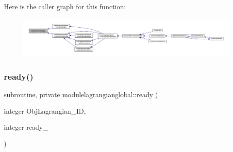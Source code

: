 Here is the caller graph for this function\+:\nopagebreak
\begin{figure}[H]
\begin{center}
\leavevmode
\includegraphics[width=350pt]{namespacemodulelagrangianglobal_a4240be74d2a3261aba8c239da33b8efe_icgraph}
\end{center}
\end{figure}
\mbox{\label{namespacemodulelagrangianglobal_ab75b97011a170683ac68816525771168}} 
\subsubsection{\texorpdfstring{ready()}{ready()}}
{\footnotesize\ttfamily subroutine, private modulelagrangianglobal\+::ready (\begin{DoxyParamCaption}\item[{integer}]{Obj\+Lagrangian\+\_\+\+ID,  }\item[{integer}]{ready\+\_\+ }\end{DoxyParamCaption})\hspace{0.3cm}{\ttfamily [private]}}


